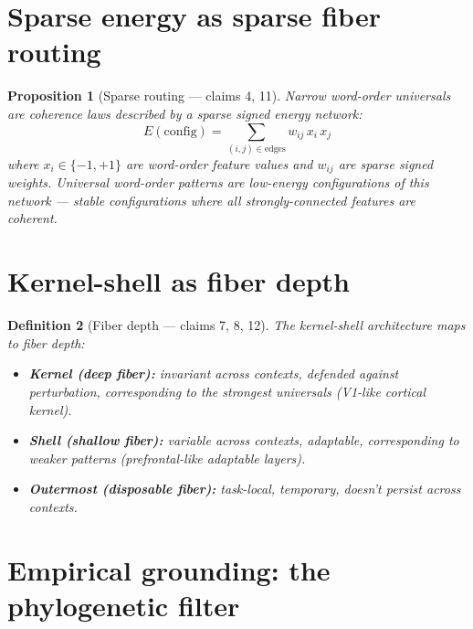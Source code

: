 \documentclass[11pt,a4paper]{article}
\newtheorem{definition}{Definition}[section]
\newtheorem{proposition}[definition]{Proposition}
\begin{document}
\section{Sparse energy as sparse fiber routing}

\begin{proposition}[Sparse routing --- claims 4, 11]
\label{prop:sparse}
Narrow word-order universals are coherence laws described by a sparse
signed energy network:
\[
  E(\text{config}) = \sum_{(i,j) \in \text{edges}} w_{ij} \, x_i \, x_j
\]
where $x_i \in \{-1, +1\}$ are word-order feature values and $w_{ij}$
are sparse signed weights. Universal word-order patterns are low-energy
configurations of this network --- stable configurations where all
strongly-connected features are coherent.
\end{proposition}

\section{Kernel-shell as fiber depth}

\begin{definition}[Fiber depth --- claims 7, 8, 12]
The kernel-shell architecture maps to fiber depth:
\begin{itemize}
  \item \textbf{Kernel (deep fiber):} invariant across contexts,
    defended against perturbation, corresponding to the strongest
    universals (V1-like cortical kernel).
  \item \textbf{Shell (shallow fiber):} variable across contexts,
    adaptable, corresponding to weaker patterns (prefrontal-like
    adaptable layers).
  \item \textbf{Outermost (disposable fiber):} task-local, temporary,
    doesn't persist across contexts.
\end{itemize}
\end{definition}


\section{Empirical grounding: the phylogenetic filter}
\label{sec:empirical}
\end{document}
